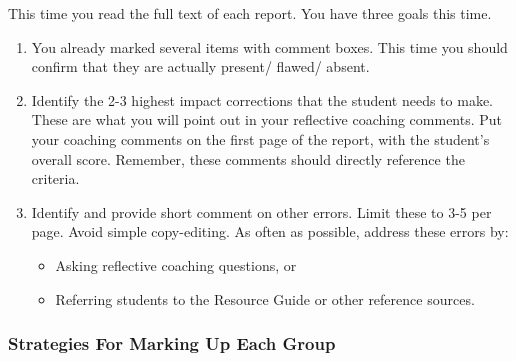 \documentclass[
]{book}
\providecommand{\tightlist}{%
  \setlength{\itemsep}{0pt}\setlength{\parskip}{0pt}}
\begin{document}
This time you read the full text of each report. You have three goals this time.

\begin{enumerate}
\def\labelenumi{\arabic{enumi}.}
\tightlist
\item
  You already marked several items with comment boxes. This time you should confirm that they are actually present/ flawed/ absent.
\item
  Identify the 2-3 highest impact corrections that the student needs to make. These are what you will point out in your reflective coaching comments. Put your coaching comments on the first page of the report, with the student's overall score. Remember, these comments should directly reference the criteria.
\item
  Identify and provide short comment on other errors. Limit these to 3-5 per page. Avoid simple copy-editing. As often as possible, address these errors by:

  \begin{itemize}
  \tightlist
  \item
    Asking reflective coaching questions, or
  \item
    Referring students to the Resource Guide or other reference sources.
  \end{itemize}
\end{enumerate}

\hypertarget{strategies-for-marking-up-each-group}{%
\subsubsection{Strategies For Marking Up Each Group}\label{strategies-for-marking-up-each-group}}
\end{document}
